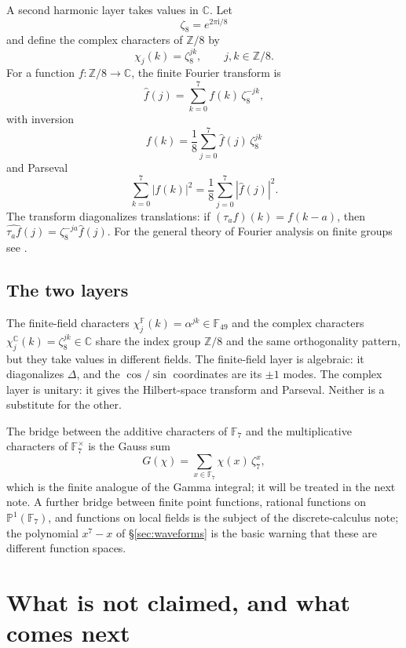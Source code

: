 \documentclass[11pt]{article}
\theoremstyle{definition}
\theoremstyle{remark}
\newcommand{\F}{\mathbb{F}}
\newcommand{\Z}{\mathbb{Z}}
\newcommand{\ii}{\mathrm{i}}
\newcommand{\C}{\mathbb{C}}
\begin{document}
A second harmonic layer takes values in $\C$.  Let
\[
  \zeta_8=e^{2\pi\ii/8}
\]
and define the complex characters of $\Z/8$ by
\[
  \chi_j(k)=\zeta_8^{jk},\qquad j,k\in\Z/8 .
\]
For a function $f:\Z/8\to\C$, the finite Fourier transform is
\[
  \widehat f(j)=\sum_{k=0}^{7} f(k)\,\zeta_8^{-jk},
\]
with inversion
\[
  f(k)=\frac18\sum_{j=0}^{7}\widehat f(j)\,\zeta_8^{jk}
\]
and Parseval
\[
  \sum_{k=0}^{7}|f(k)|^2=\frac18\sum_{j=0}^{7}|\widehat f(j)|^2 .
\]
The transform diagonalizes translations: if $(\tau_a f)(k)=f(k-a)$, then
$\widehat{\tau_a f}(j)=\zeta_8^{-ja}\widehat f(j)$.  For the general theory of
Fourier analysis on finite groups see \cite{FTN}.

\subsection{The two layers}

The finite-field characters $\chi_j^{\F}(k)=\alpha^{jk}\in\F_{49}$ and the
complex characters $\chi_j^{\C}(k)=\zeta_8^{jk}\in\C$ share the index group
$\Z/8$ and the same orthogonality pattern, but they take values in different
fields.  The finite-field layer is algebraic: it diagonalizes $\Delta$, and the
$\cos/\sin$ coordinates are its $\pm1$ modes.  The complex layer is unitary: it
gives the Hilbert-space transform and Parseval.  Neither is a substitute for the
other.

The bridge between the additive characters of $\F_7$ and the multiplicative
characters of $\F_7^\times$ is the Gauss sum
\[
  G(\chi)=\sum_{x\in\F_7}\chi(x)\,\zeta_7^{x},
\]
which is the finite analogue of the Gamma integral; it will be treated in the
next note.  A further bridge between finite point functions, rational functions
on $\mathbb P^1(\F_7)$, and functions on local fields is the subject of the
discrete-calculus note; the polynomial $x^7-x$ of \S\ref{sec:waveforms} is the
basic warning that these are different function spaces.

\section{What is not claimed, and what comes next}
\label{sec:boundary}
\end{document}
